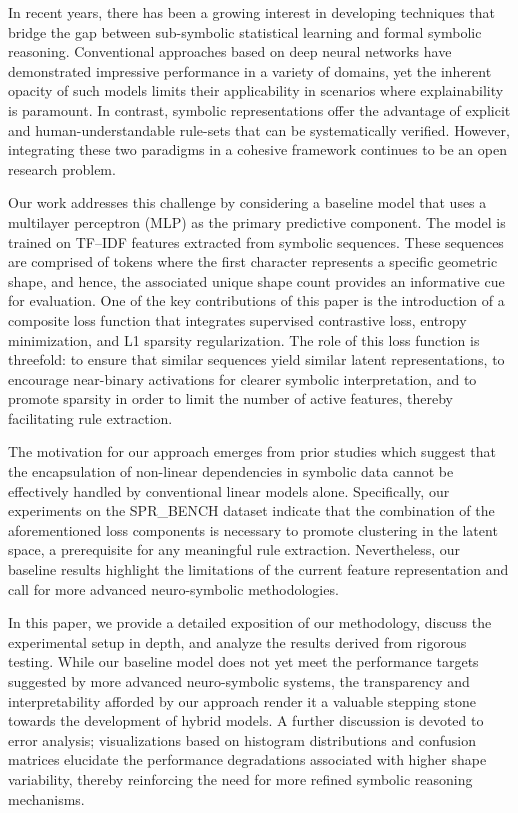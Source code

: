 \documentclass{article}
\begin{document}
In recent years, there has been a growing interest in developing techniques that bridge the gap between sub-symbolic statistical learning and formal symbolic reasoning. Conventional approaches based on deep neural networks have demonstrated impressive performance in a variety of domains, yet the inherent opacity of such models limits their applicability in scenarios where explainability is paramount. In contrast, symbolic representations offer the advantage of explicit and human-understandable rule-sets that can be systematically verified. However, integrating these two paradigms in a cohesive framework continues to be an open research problem.

Our work addresses this challenge by considering a baseline model that uses a multilayer perceptron (MLP) as the primary predictive component. The model is trained on TF–IDF features extracted from symbolic sequences. These sequences are comprised of tokens where the first character represents a specific geometric shape, and hence, the associated unique shape count provides an informative cue for evaluation. One of the key contributions of this paper is the introduction of a composite loss function that integrates supervised contrastive loss, entropy minimization, and L1 sparsity regularization. The role of this loss function is threefold: to ensure that similar sequences yield similar latent representations, to encourage near-binary activations for clearer symbolic interpretation, and to promote sparsity in order to limit the number of active features, thereby facilitating rule extraction.

The motivation for our approach emerges from prior studies which suggest that the encapsulation of non-linear dependencies in symbolic data cannot be effectively handled by conventional linear models alone. Specifically, our experiments on the SPR\_BENCH dataset indicate that the combination of the aforementioned loss components is necessary to promote clustering in the latent space, a prerequisite for any meaningful rule extraction. Nevertheless, our baseline results highlight the limitations of the current feature representation and call for more advanced neuro-symbolic methodologies.

In this paper, we provide a detailed exposition of our methodology, discuss the experimental setup in depth, and analyze the results derived from rigorous testing. While our baseline model does not yet meet the performance targets suggested by more advanced neuro-symbolic systems, the transparency and interpretability afforded by our approach render it a valuable stepping stone towards the development of hybrid models. A further discussion is devoted to error analysis; visualizations based on histogram distributions and confusion matrices elucidate the performance degradations associated with higher shape variability, thereby reinforcing the need for more refined symbolic reasoning mechanisms.
\end{document}
